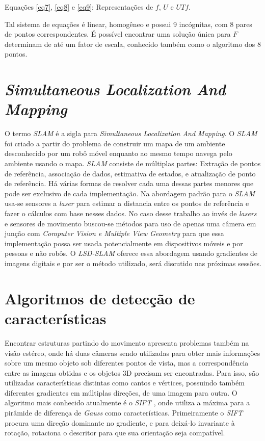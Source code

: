 Equações \eqref{eq7}, \eqref{eq8} e \eqref{eq9}: Representações de $f$, $U$ e $UTf$.

Tal sistema de equações é linear, homogêneo e possui 9 incógnitas, com 8 pares de pontos correspondentes. É possível encontrar uma solução única para $F$ determinam de até um fator de escala, conhecido também como o algoritmo dos 8 pontos.

\section{\textit{Simultaneous Localization And Mapping}}

O termo \textit{SLAM} é a sigla para \textit{Simultaneous Localization And Mapping}. O \textit{SLAM} foi criado a partir do problema de construir um mapa de um ambiente desconhecido por um robô móvel enquanto ao mesmo tempo navega pelo ambiente usando o mapa. \textit{SLAM} consiste de múltiplas partes: Extração de pontos de referência, associação de dados, estimativa de estados, e atualização de ponto de referência. Há várias formas de resolver cada uma dessas partes menores que pode ser exclusivo de cada implementação\cite{SLAM-Dummies}. Na abordagem padrão para o \textit{SLAM} usa-se sensores a \textit{laser} para estimar a distancia entre os pontos de referência e fazer o cálculos com base nesses dados. No caso desse trabalho ao invés de \textit{lasers} e sensores de movimento buscou-se métodos para uso de apenas uma câmera em junção com \textit{Computer Vision e Multiple View Geometry} para que essa implementação possa ser usada potencialmente em dispositivos móveis e por pessoas e não robôs. O \textit{LSD-SLAM} oferece essa abordagem usando gradientes de imagens digitais e por ser o método utilizado, será discutido nas próximas sessões.

\section{Algoritmos de detecção de características}

Encontrar estruturas partindo do movimento apresenta problemas também na visão estéreo, onde há duas câmeras sendo utilizadas para obter mais informações sobre um mesmo objeto sob diferentes pontos de vista, mas a correspondência entre as imagens obtidas e os objetos 3D precisam ser encontradas. Para isso, são utilizadas características distintas como cantos e vértices, possuindo também diferentes gradientes em múltiplas direções, de uma imagem para outra. O algoritmo mais conhecido atualmente é o \textit{SIFT} \cite{SIFT}, onde utiliza a máxima para a pirâmide de diferença de \textit{Gauss} como características. Primeiramente o \textit{SIFT} procura uma direção dominante no gradiente, e para deixá-lo invariante à rotação, rotaciona o descritor para que sua orientação seja compatível.

